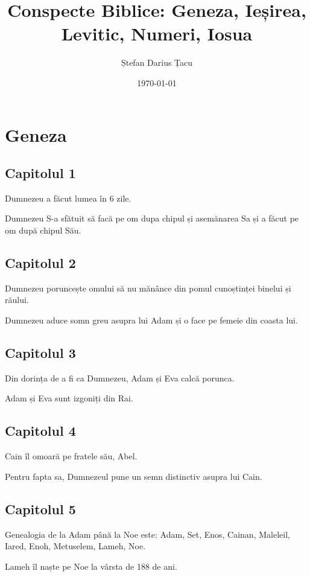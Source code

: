 \documentclass[12pt,a4paper]{article}
\title{Conspecte Biblice: Geneza, Ieșirea, Levitic, Numeri, Iosua}
\author{Ștefan Darius Țacu}
\date{\today}
\begin{document}
\maketitle

\section{Geneza}

\subsection{Capitolul 1}

Dumnezeu a făcut lumea în 6 zile.

Dumnezeu S-a sfătuit să facă pe om dupa chipul și asemănarea Sa și
a făcut pe om după chipul Său.

\subsection{Capitolul 2}

Dumnezeu poruncește omului să nu mănânce din pomul cunoștinței binelui și răului.

Dumnezeu aduce somn greu asupra lui Adam și o face pe femeie din coasta lui.

\subsection{Capitolul 3}

Din dorința de a fi ca Dumnezeu, Adam și Eva calcă porunca.

Adam și Eva sunt izgoniți din Rai.

\subsection{Capitolul 4}

Cain îl omoară pe fratele său, Abel.

Pentru fapta sa, Dumnezeul pune un semn distinctiv asupra lui Cain.

\subsection{Capitolul 5}

Genealogia de la Adam până la Noe este: Adam, Set, Enos, Cainan, Maleleil,
Iared, Enoh, Metuselem, Lameh, Noe.

Lameh îl naște pe Noe la vârsta de 188 de ani.
\end{document}
